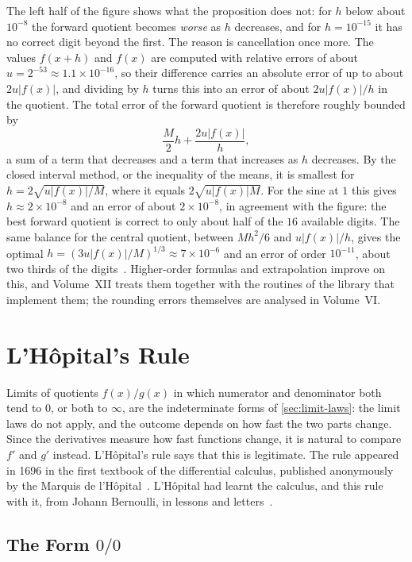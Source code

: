The left half of the figure shows what the proposition does not: for $h$ below about $10^{-8}$ the forward quotient becomes \emph{worse} as $h$ decreases, and for $h=10^{-15}$ it has no correct digit beyond the first. The reason is cancellation once more. The values $f(x+h)$ and $f(x)$ are computed with relative errors of about $u=2^{-53}\approx1.1\times10^{-16}$, so their difference carries an absolute error of up to about $2u|f(x)|$, and dividing by $h$ turns this into an error of about $2u|f(x)|/h$ in the quotient. The total error of the forward quotient is therefore roughly bounded by
\[
\frac M2h+\frac{2u|f(x)|}h ,
\]
a sum of a term that decreases and a term that increases as $h$ decreases. By the closed interval method, or the inequality of the means, it is smallest for $h=2\sqrt{u|f(x)|/M}$, where it equals $2\sqrt{u|f(x)|M}$. For the sine at $1$ this gives $h\approx2\times10^{-8}$ and an error of about $2\times10^{-8}$, in agreement with the figure: the best forward quotient is correct to only about half of the $16$ available digits. The same balance for the central quotient, between $Mh^2/6$ and $u|f(x)|/h$, gives the optimal $h=(3u|f(x)|/M)^{1/3}\approx7\times10^{-6}$ and an error of order $10^{-11}$, about two thirds of the digits~\cite{nocedal2006}. Higher-order formulas and extrapolation improve on this, and Volume~XII treats them together with the routines of the library that implement them; the rounding errors themselves are analysed in Volume~VI.

\section{L'H\^opital's Rule}
\label{sec:lhopital}

Limits of quotients $f(x)/g(x)$ in which numerator and denominator both tend to $0$, or both to $\infty$, are the indeterminate forms of \cref{sec:limit-laws}: the limit laws do not apply, and the outcome depends on how fast the two parts change. Since the derivatives measure how fast functions change, it is natural to compare $f'$ and $g'$ instead. L'H\^opital's rule says that this is legitimate. The rule appeared in 1696 in the first textbook of the differential calculus, published anonymously by the Marquis de l'H\^opital~\cite{lhopital1696}. L'H\^opital had learnt the calculus, and this rule with it, from Johann Bernoulli, in lessons and letters~\cite{edwards1979}.

\subsection{The Form \texorpdfstring{$0/0$}{0/0}}

